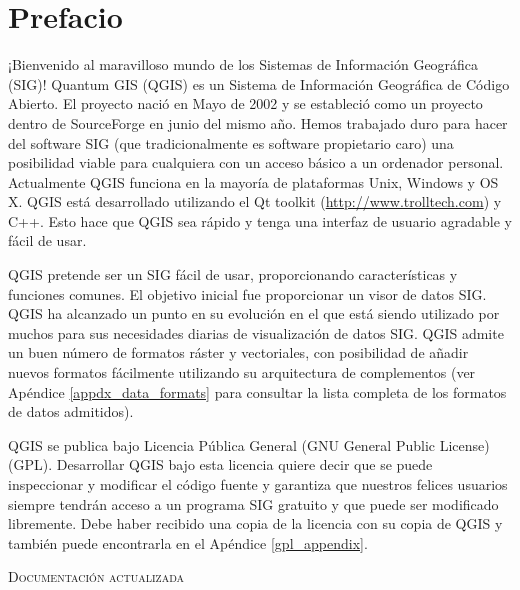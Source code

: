 
\section{Prefacio}\label{label_forward}
\setcounter{page}{1}


¡Bienvenido al maravilloso mundo de los Sistemas de Información Geográfica (SIG)!
Quantum GIS (QGIS) es un Sistema de Información Geográfica de Código Abierto. 
El proyecto nació en Mayo de 2002 y se estableció como un proyecto dentro de 
SourceForge en junio del mismo año. Hemos trabajado duro para hacer del 
software SIG (que tradicionalmente es software propietario caro) una posibilidad
viable para cualquiera con un acceso básico a un ordenador personal. 
Actualmente QGIS funciona en la mayoría de plataformas Unix, Windows y OS X. 
QGIS está desarrollado utilizando el Qt toolkit (\url{http://www.trolltech.com})
y C++. Esto hace que QGIS sea rápido y tenga una interfaz de usuario agradable
y fácil de usar.

QGIS pretende ser un SIG fácil de usar, proporcionando características y 
funciones comunes. El objetivo inicial fue proporcionar un visor de datos SIG. 
QGIS ha alcanzado un punto en su evolución en el que está siendo utilizado por muchos 
para sus necesidades diarias de visualización de datos SIG. QGIS admite un 
buen número de formatos ráster y vectoriales, con posibilidad de añadir nuevos formatos fácilmente
utilizando su arquitectura de complementos (ver Apéndice \ref{appdx_data_formats} 
para consultar la lista completa de los formatos de datos admitidos).

QGIS se publica bajo Licencia Pública General (GNU General Public License) (GPL). 
Desarrollar QGIS bajo esta licencia quiere decir que se puede inspeccionar y 
modificar el código fuente y garantiza que nuestros felices 
usuarios siempre tendrán acceso a un programa SIG gratuito y que puede ser 
modificado libremente. Debe haber recibido una copia de la licencia con su copia 
de QGIS y también puede encontrarla en el Apéndice \ref{gpl_appendix}.

\begin{Tip}\caption{\textsc{Documentación actualizada}}
\end{Tip}

